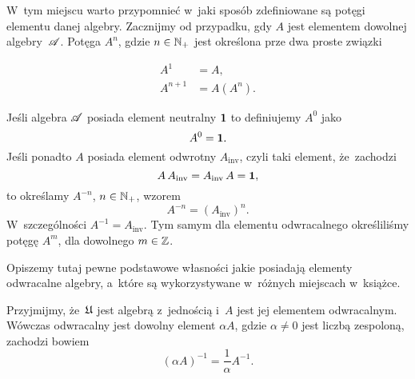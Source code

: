 \documentclass[a4paper,11pt]{article}
\begin{document}
\noindent
{} W~tym miejscu warto przypomnieć w~jaki sposób zdefiniowane są
potęgi elementu danej algebry. Zacznijmy od przypadku, gdy $A$ jest
elementem dowolnej algebry~$\mathcal{A}$. Potęga $A^{ n }$, gdzie
$n \in \mathbb{N}_{ + }$ jest określona prze dwa proste związki

\negVerSpaceFour


\begin{subequations}

  \begin{align}
    \label{eq:Bratteli-Robinson-Operator-Algebras-ETC-Vol-I-s01-15-A}
    A^{ 1 } &= A, \\
    \label{eq:Bratteli-Robinson-Operator-Algebras-ETC-Vol-I-s01-15-B}
    A^{ n + 1 } &= A ( A^{ n } ).
  \end{align}

\end{subequations}


\noindent
Jeśli algebra $\mathcal{A}$ posiada element neutralny $\mathbf{1}$ to definiujemy
$A^{ 0 }$ jako
\begin{equation}
  \label{eq:Bratteli-Robinson-Operator-Algebras-ETC-Vol-I-s01-16}
  A^{ 0 } = \mathbf{1}.
\end{equation}
Jeśli ponadto $A$ posiada element odwrotny $A_{ \textrm{inv} }$, czyli taki
element, że~zachodzi
\begin{equation}
  \label{eq:Bratteli-Robinson-Operator-Algebras-ETC-Vol-I-s01-17}
  A \, A_{ \textrm{inv} } = A_{ \textrm{inv} } \, A = \mathbf{1},
\end{equation}
to określamy $A^{ -n }$, $n \in \mathbb{N}_{ + }$, wzorem
\begin{equation}
  \label{eq:Bratteli-Robinson-Operator-Algebras-ETC-Vol-I-s01-18}
  A^{ -n } = ( A_{ \textrm{inv} } )^{ n }.
\end{equation}
W~szczególności $A^{ -1 } = A_{ \textrm{inv} }$. Tym samym dla elementu
odwracalnego określiliśmy potęgę $A^{ m }$, dla dowolnego $m \in \mathbb{Z}$.

\VerSpaceFour





\noindent
{} Opiszemy tutaj pewne podstawowe własności jakie posiadają
elementy odwracalne algebry, a~które są wykorzystywane w~różnych miejscach
w~książce.

Przyjmijmy, że~$\mathfrak{U}$ jest algebrą z~jednością i~$A$ jest jej elementem
odwracalnym. Wówczas odwracalny jest dowolny element $\alpha A$, gdzie $\alpha \neq 0$
jest liczbą zespoloną, zachodzi bowiem
\begin{equation}
  \label{eq:Bratteli-Robinson-Operator-Algebras-ETC-Vol-I-s01-19}
  ( \alpha A )^{ -1 } = \frac{ 1 }{ \alpha } A^{ -1 }.
\end{equation}
\end{document}
